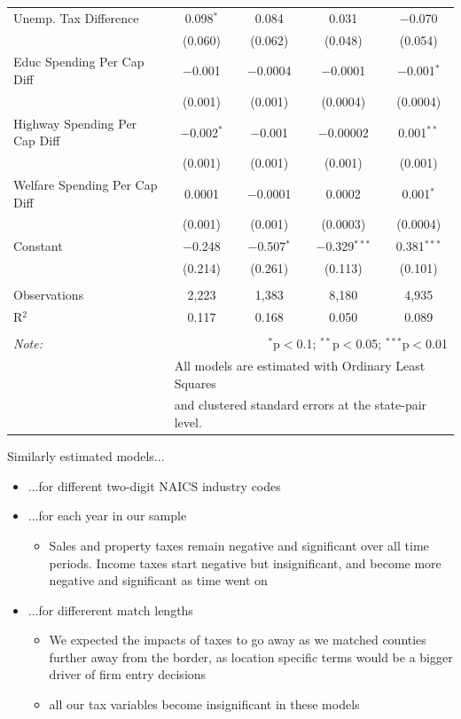\documentclass{beamer}
\begin{document}
\begin{frame}
\begin{table}[!htbp]
{{\begin{tabular}{@{\extracolsep{5pt}}lcccc}
  Unemp. Tax Difference & 0.098$^{*}$ & 0.084 & 0.031 & $-$0.070 \\ 
  & (0.060) & (0.062) & (0.048) & (0.054) \\ 
  Educ Spending Per Cap Diff & $-$0.001 & $-$0.0004 & $-$0.0001 & $-$0.001$^{*}$ \\ 
  & (0.001) & (0.001) & (0.0004) & (0.0004) \\ 
  Highway Spending Per Cap Diff & $-$0.002$^{*}$ & $-$0.001 & $-$0.00002 & 0.001$^{**}$ \\ 
  & (0.001) & (0.001) & (0.001) & (0.001) \\ 
  Welfare Spending Per Cap Diff & 0.0001 & $-$0.0001 & 0.0002 & 0.001$^{*}$ \\ 
  & (0.001) & (0.001) & (0.0003) & (0.0004) \\ 
  Constant & $-$0.248 & $-$0.507$^{*}$ & $-$0.329$^{***}$ & 0.381$^{***}$ \\ 
  & (0.214) & (0.261) & (0.113) & (0.101) \\ 
 \hline \\[-1.8ex] 
Observations & 2,223 & 1,383 & 8,180 & 4,935 \\ 
R$^{2}$ & 0.117 & 0.168 & 0.050 & 0.089 \\ 
\hline 
\hline \\[-1.8ex] 
\textit{Note:}  & \multicolumn{4}{r}{$^{*}$p$<$0.1; $^{**}$p$<$0.05; $^{***}$p$<$0.01} \\ 
 & \multicolumn{4}{l}{All models are estimated with Ordinary Least Squares} \\ 
 & \multicolumn{4}{l}{and clustered standard errors at the state-pair level.} \\ 
\end{tabular}}}
\end{table} 
\end{frame}

\begin{frame}
Similarly estimated models...
\begin{itemize}
\item ...for different two-digit NAICS industry codes
\item ...for each year in our sample
\begin{itemize}
\item Sales and property taxes remain negative and significant over all time periods. Income taxes start negative but insignificant, and become more negative and significant as time went on
\end{itemize}
\item ...for differerent match lengths
\begin{itemize}
\item We expected the impacts of taxes to go away as we matched counties further away from the border, as location specific terms would be a bigger driver of firm entry decisions
\item all our tax variables become insignificant in these models
\end{itemize}
\end{itemize}
\end{frame}
\end{document}

